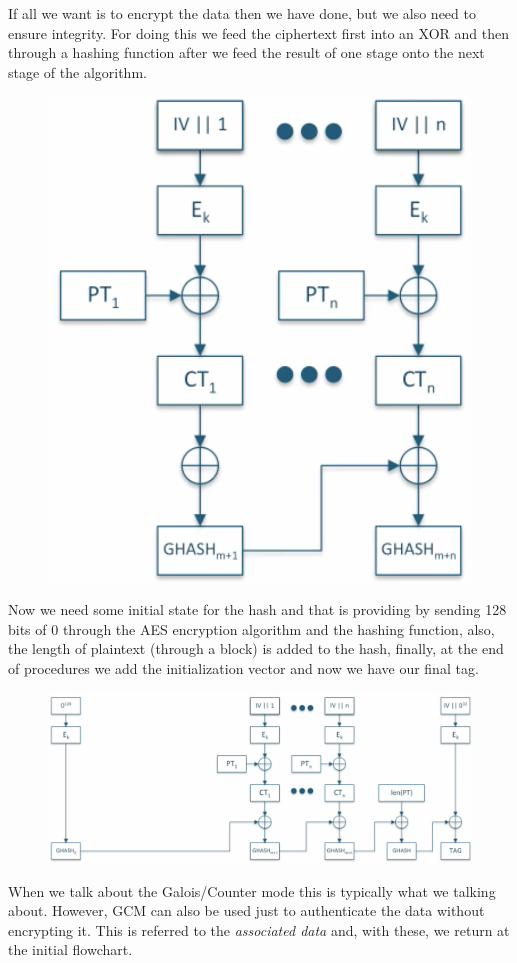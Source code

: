\documentclass[11pt]{article}
\begin{document}
If all we want is to encrypt the data then we have done, but we also need to ensure integrity. For doing this we feed the ciphertext first into an XOR and then through a hashing function after we feed the result of one stage onto the next stage of the algorithm.
\begin{figure}[hbt!]
  \centering
  \includegraphics[width=.50\textwidth, height=.35\textheight]{pic4-hw3-1635747}
  \label{fig: Hashing function for AD}
\end{figure}
\newpage
Now we need some initial state for the hash and that is providing by sending 128 bits of 0 through the AES encryption algorithm and the hashing function, also, the length of plaintext (through a block) is added to the hash, finally, at the end of procedures we add the initialization vector and now we have our final tag.

\begin{figure}[hbt!]
  \centering
  \includegraphics[width=1\textwidth]{pic5-hw3-1635747}
  \label{fig:GCM for AD}
\end{figure}

When we talk about the Galois/Counter mode this is typically what we talking about. However, GCM can also be used just to authenticate the data without encrypting it. This is referred to the {\em associated data} and, with these, we return at the initial flowchart.
\end{document}

